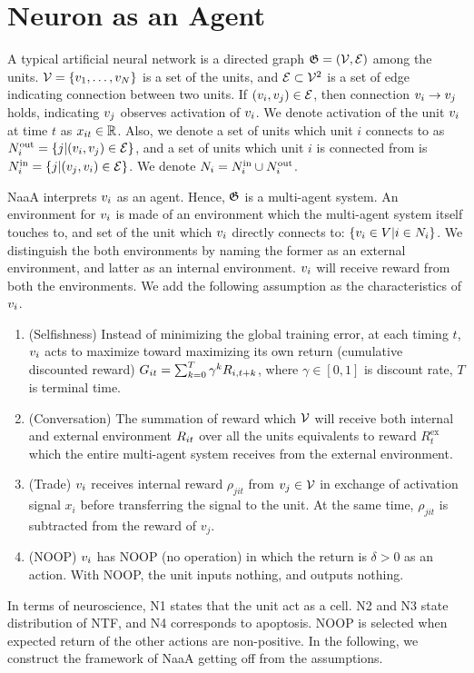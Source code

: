 \section{Neuron as an Agent}

A typical artificial neural network is a directed graph $\mathfrak{G} = (\mathcal{V}, \mathcal{E})$ among the units.
$\mathcal{V} = \{v_{1}, \dots, v_{N}\}$ is a set of the units, and $\mathcal{E} \subset \mathcal{V}^2$ is a set of edge indicating connection between two units.
If $(v_{i}, v_{j}) \in \mathcal{E}$, then connection $v_{i} \rightarrow v_{j}$ holds, indicating $v_{j}$ observes activation of $v_{i}$.
We denote activation of the unit $v_{i}$ at time $t$ as $x_{it} \in \mathbb{R}$.
Also, we denote a set of units which unit $i$ connects to as $N^\mathrm{out}_i = \{j | (v_{i}, v_{j}) \in \mathcal{E} \}$, and a set of units which unit $i$ is connected from is $N^\mathrm{in}_i = \{j | (v_{j}, v_{i}) \in \mathcal{E} \}$.
We denote $N_i = N^\mathrm{in}_i \cup N^\mathrm{out}_i$.

NaaA interprets $v_{i}$ as an agent.
Hence, $\mathfrak{G}$ is a multi-agent system.
An environment for $v_{i}$ is made of an environment which the multi-agent system itself touches to, and 
set of the unit which $v_{i}$ directly connects to: $\{v_i \in V | i \in N_i\}$.
We distinguish the both environments by naming the former as an external environment, and latter as an internal environment.
$v_{i}$ will receive reward from both the environments.
We add the following assumption as the characteristics of $v_{i}$.
\begin{enumerate}
\renewcommand{\labelenumi}{N\arabic{enumi}:}
\item (Selfishness) 
	Instead of minimizing the global training error,
	at each timing $t$, $v_{i}$ acts to maximize toward maximizing its own return (cumulative discounted reward)
	$G_{it} = \sum_{k=0}^T \gamma^k R_{i,t+k}$, where $\gamma \in [0, 1]$ is discount rate, $T$ is terminal time.
\item (Conversation) 
	The summation of reward which $\mathcal{V}$ will receive both internal and external environment $R_{it}$ over 
	all the units equivalents to reward $R_t^{\mathrm{ex}}$ which the entire multi-agent system receives from 
	the external environment.
\item (Trade) 
	$v_{i}$ receives internal reward $\rho_{jit}$ from $v_{j} \in \mathcal{V}$ in exchange of activation signal $x_i$ 
	before transferring the signal to the unit. At the same time, $\rho_{jit}$ is subtracted from the reward of $v_j$.
\item (NOOP) 
	$v_{i}$ has NOOP (no operation) in which the return is $\delta > 0$ as an action.
	With NOOP, the unit inputs nothing, and outputs nothing.
\end{enumerate}
In terms of neuroscience,
N1 states that the unit act as a cell.
N2 and N3 state distribution of NTF, and N4 corresponds to apoptosis.
NOOP is selected when expected return of the other actions are non-positive.
In the following, we construct the framework  of NaaA getting off from the assumptions.

